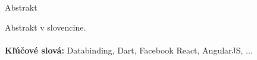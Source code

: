 \documentclass[oneside, 12pt]{book}
\def\mfkeywordssk{Databinding, Dart, Facebook React, AngularJS, ... }      %
\begin{document}
\noindent
\begin{center}
\begin{minipage}{1\textwidth}
\centerline{\large Abstrakt}
Abstrakt v slovencine.
\\ \\ 
{\bf Kľúčové slová:} \mfkeywordssk
\end{minipage}
\end{center}
\eject %



%

\tableofcontents

\listoffigures

\mainmatter

\pagestyle{plain}

\pagestyle{plain}
\end{document}
